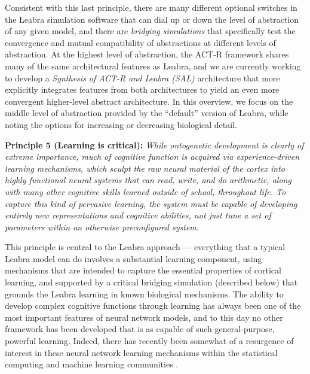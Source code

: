 \documentclass[11pt,twoside]{article}
\begin{document}
Consistent with this last principle, there are many different optional
switches in the Leabra simulation software that can dial up or down
the level of abstraction of any given model, and there are {\em
  bridging simulations} that specifically test the convergence and
mutual compatibility of abstractions at different levels of
abstraction.  At the highest level of abstraction, the ACT-R framework
shares many of the same architectural features as Leabra, and we are
currently working to develop a {\em Synthesis of ACT-R and Leabra
  (SAL)} architecture that more explicitly integrates features from
both architectures to yield an even more convergent higher-level
abstract architecture.  In this overview, we focus on the middle level
of abstraction provided by the ``default'' version of Leabra, while
noting the options for increasing or decreasing biological detail.

{\bf Principle 5 (Learning is critical):} {\em While ontogenetic
  development is clearly of extreme importance, much of cognitive
  function is acquired via experience-driven learning mechanisms,
  which sculpt the raw neural material of the cortex into highly
  functional neural systems that can read, write, and do arithmetic,
  along with many other cognitive skills learned outside of school,
  throughout life.  To capture this kind of pervasive learning, the
  system must be capable of developing entirely new representations
  and cognitive abilities, not just tune a set of parameters within an
  otherwise preconfigured system.}

This principle is central to the Leabra approach --- everything that a
typical Leabra model can do involves a substantial learning component,
using mechanisms that are intended to capture the essential properties
of cortical learning, and supported by a critical bridging simulation
(described below) that grounds the Leabra learning in known biological
mechanisms.  The ability to develop complex cognitive functions
through learning has always been one of the most important features of
neural network models, and to this day no other framework has been
developed that is as capable of such general-purpose, powerful
learning.  Indeed, there has recently been somewhat of a resurgence of
interest in these neural network learning mechanisms within the
statistical computing and machine learning communities
\cite{RBM,schmidhuber,undirectedbayes,etc}.
\end{document}
